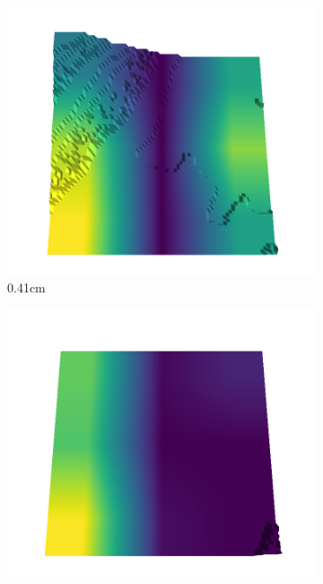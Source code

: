\begin{figure}[H]
\begin{subfigure}[b]{0.192\linewidth}
    \label{fig : quarry-best-4}
    \end{subfigure}
    \begin{subfigure}[b]{0.192\linewidth}
    \includegraphics[width=\linewidth]{../img/5/quarry/best/41-patch-3d-majavi-colormap-50.png}
    \caption{0.41cm}
    \label{fig : quarry-best-5}
    \end{subfigure}
    \begin{subfigure}[b]{0.192\linewidth}
    \includegraphics[width=\linewidth]{../img/5/quarry/best/44-patch-3d-majavi-colormap-60.png}

\end{subfigure}
\end{figure}
